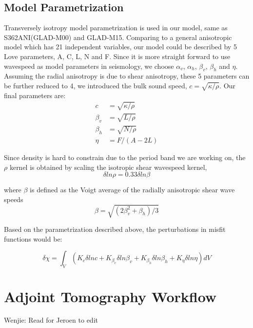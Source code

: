 \documentclass[extra,mreferee]{gji}
\begin{document}
\subsection{Model Parametrization}
Transversely isotropy model parametrization is used in our model, same as S362ANI(GLAD-M00)
and GLAD-M15. Comparing to a general anisotropic model which has 21 independent variables,
our model could be described by 5 Love parameters, A, C, L, N and F\citep{love2013treatise}.
Since it is more straight forward to use  wavespeed as model parameters in seismology,
we choose $\alpha_v$, $\alpha_h$, $\beta_v$, $\beta_h$ and $\eta$.
Assuming the radial anisotropy is due to shear anisotropy, these 5 parameters
can be further reduced to 4, we introduced the bulk sound speed,
$c=\sqrt{\kappa/\rho}$. Our final parameters are:\\
\begin{align*}
      c &= \sqrt{\kappa/\rho} \\
\beta_v &= \sqrt{L/\rho} \\
\beta_h &= \sqrt{N/\rho} \\
\eta & = F/(A-2L)
\end{align*}

Since density is hard to constrain due to the period band we are working on, the $\rho$ kernel is obtained by scaling the isotropic shear wavespeed kernel\citep{montagner1989petrological},\\
\begin{equation*}
    \delta ln\rho = 0.33\delta ln\beta
\end{equation*}

where $\beta$ is defined as the Voigt average of the radially anisotropic shear wave speeds\citep{babuska1991seismic}
$$\beta = \sqrt{(2\beta_v^2 + \beta_h)/3}$$

Based on the parametrization described above, the perturbations in misfit functions would be:

\begin{equation*}
    \delta \chi = \int_V
      (K_c\delta lnc + K_{\beta_v}\delta ln\beta_v + K_{\beta_h}\delta ln\beta_h +
      K_\eta \delta ln\eta) dV
\end{equation*}

\section{Adjoint Tomography Workflow}

{\color{Red} Wenjie: Read for Jeroen to edit}
\end{document}
